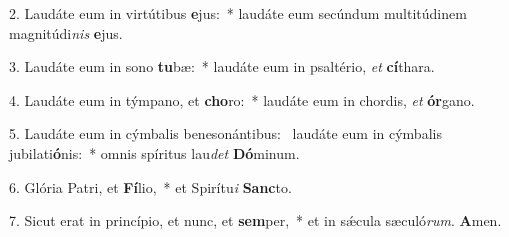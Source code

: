 2. Laudáte eum in virtútibus \textbf{e}jus:~*  laudáte eum secúndum multitúdinem magnitúdi\textit{nis} \textbf{e}jus.\

3. Laudáte eum in sono \textbf{tu}bæ:~*  laudáte eum in psaltério, \textit{et} \textbf{cí}thara.\

4. Laudáte eum in týmpano, et \textbf{cho}ro:~*  laudáte eum in chordis, \textit{et} \textbf{ór}gano.\

5. Laudáte eum in cýmbalis benesonántibus: \dag\  laudáte eum in cýmbalis jubilati\textbf{ó}nis:~*  omnis spíritus lau\textit{det} \textbf{Dó}minum.\

6. Glória Patri, et \textbf{Fí}lio,~*  et Spirítu\textit{i} \textbf{Sanc}to.\

7. Sicut erat in princípio, et nunc, et \textbf{sem}per,~*  et in sǽcula sæculó\textit{rum}. \textbf{A}men.\

